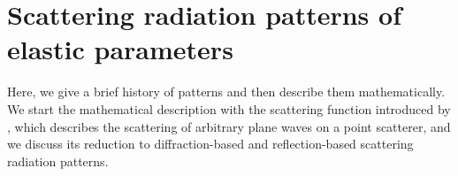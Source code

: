 \section{Scattering radiation patterns of elastic parameters}

Here, we give a brief history of patterns and then describe them mathematically.
We start the mathematical description with the scattering function introduced by \cite{eaton1994}, which describes the scattering of arbitrary plane waves on a point scatterer, and we discuss its reduction to diffraction-based 
\citep{wu1985,tarantola1986} and reflection-based 
\citep{gholami20131,alkhalifah2014} scattering radiation patterns.









